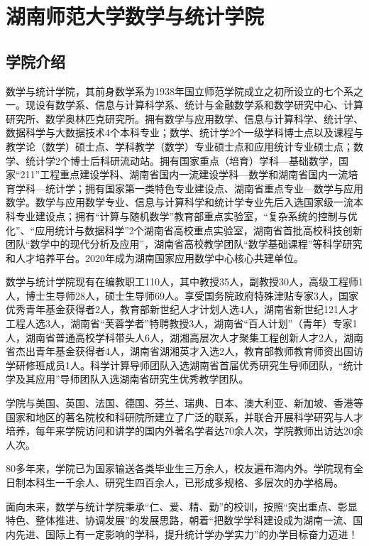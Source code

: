\chapter{湖南师范大学数学与统计学院}

\section{学院介绍}

数学与统计学院，其前身数学系为1938年国立师范学院成立之初所设立的七个系之一。现设有数学系、信息与计算科学系、统计与金融数学系和数学研究中心、计算研究所、数学奥林匹克研究所。拥有数学与应用数学、信息与计算科学、统计学、数据科学与大数据技术4个本科专业；数学、统计学2个一级学科博士点以及课程与教学论（数学）硕士点、学科教学（数学）专业硕士点和应用统计专业硕士点；数学、统计学2个博士后科研流动站。拥有国家重点（培育）学科—基础数学，国家“211”工程重点建设学科、湖南省国内一流建设学科—数学和湖南省国内一流培育学科—统计学；拥有国家第一类特色专业建设点、湖南省重点专业—数学与应用数学。数学与应用数学专业、信息与计算科学和统计学专业先后入选国家级一流本科专业建设点；拥有“计算与随机数学”教育部重点实验室，“复杂系统的控制与优化”、“应用统计与数据科学”2个湖南省高校重点实验室，湖南省首批高校科技创新团队“数学中的现代分析及应用”，湖南省高校教学团队“数学基础课程”等科学研究和人才培养平台。2020年成为湖南国家应用数学中心核心共建单位。

数学与统计学院现有在编教职工110人，其中教授35人，副教授30人，高级工程师1人，博士生导师28人，硕士生导师69人。享受国务院政府特殊津贴专家3人，国家优秀青年基金获得者2人，教育部新世纪人才计划人选4人，湖南省新世纪121人才工程人选3人，湖南省“芙蓉学者”特聘教授3人，湖南省“百人计划”（青年）专家1人，湖南省普通高校学科带头人6人，湖湘高层次人才聚集工程创新人才2人，湖南省杰出青年基金获得者4人，湖南省湖湘英才入选2人，教育部教师教育师资出国访学研修班成员1人。科学计算导师团队入选湖南省首届优秀研究生导师团队，“统计学及其应用”导师团队入选湖南省研究生优秀教学团队。

学院与美国、英国、法国、德国、芬兰、瑞典、日本、澳大利亚、新加坡、香港等国家和地区的著名院校和科研院所建立了广泛的联系，并联合开展科学研究与人才培养，每年来学院访问和讲学的国内外著名学者达70余人次，学院教师出访达20余人次。

80多年来，学院已为国家输送各类毕业生三万余人，校友遍布海内外。学院现有全日制本科生一千余人、研究生四百余人，已形成多规格、多层次的办学格局。

面向未来，数学与统计学院秉承“仁、爱、精、勤”的校训，按照“突出重点、彰显特色、整体推进、协调发展”的发展思路，朝着“把数学学科建设成为湖南一流、国内先进、国际上有一定影响的学科，提升统计学办学实力”的办学目标奋力迈进！

